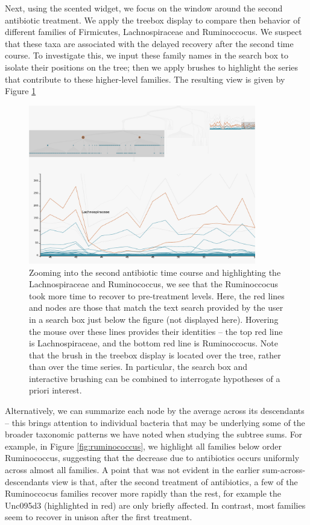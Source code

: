 \documentclass[12pt]{article}
\begin{document}
Next, using the scented widget, we focus on the window around the second
antibiotic treatment. We apply the treebox display to compare then behavior of
different families of Firmicutes, Lachnospiraceae and Ruminoccocus. We suspect
that these taxa are associated with the delayed recovery after the second time
course. To investigate this, we input these family names in the search box to
isolate their positions on the tree; then we apply brushes to highlight the
series that contribute to these higher-level families. The resulting view is
given by Figure \ref{fig:antibioticfirmicutes}

\begin{figure}
{\centering \includegraphics[width=375px]{figure/antibiotic_firmicutes}

}

\caption{Zooming into the second antibiotic time course and highlighting the
  Lachnospiraceae and Ruminococcus, we see that the Ruminoccocus took more time
  to recover to pre-treatment levels. Here, the red lines and nodes are those
  that match the text search provided by the user in a search box just below the
  figure (not displayed here). Hovering the mouse over these lines provides
  their identities -- the top red line is Lachnospiraceae, and the bottom red
  line is Ruminoccocus. Note that the brush in the treebox display is located
  over the tree, rather than over the time series. In particular, the search box
  and interactive brushing can be combined to interrogate hypotheses of a priori
  interest. \label{fig:antibioticfirmicutes}}
\end{figure}

Alternatively, we can summarize each node by the average across its descendants
-- this brings attention to individual bacteria that may be underlying some of
the broader taxonomic patterns we have noted when studying the subtree sums. For
example, in Figure \ref{fig:ruminococcus}, we highlight all families below order
Ruminococcus, suggesting that the decrease due to antibiotics occurs uniformly
across almost all families. A point that was not evident in the earlier
sum-across-descendants view is that, after the second treatment of antibiotics,
a few of the Ruminoccocus families recover more rapidly than the rest, for
example the Unc095d3 (highlighted in red) are only briefly affected. In
contrast, most families seem to recover in unison after the first treatment.
\end{document}
